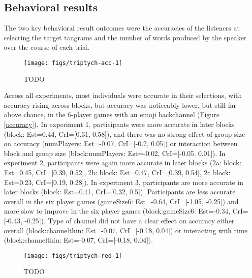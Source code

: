 \documentclass[
  english,
  a4paper,
]{article}
\begin{document}
\hypertarget{behavioral-results}{%
\subsection{Behavioral results}\label{behavioral-results}}

The two key behavioral result outcomes were the accuracies of the listeners at selecting the target tangrams and the number of words produced by the speaker over the course of each trial.

\begin{figure*}[t!]

{\centering \texttt{[image: figs/triptych-acc-1]} 

}

\caption{TODO}\label{fig:triptych-acc}
\end{figure*}

Across all experiments, most individuals were accurate in their selections, with accuracy rising across blocks, but accuracy was noticeably lower, but still far above chance, in the 6-player games with an emoji backchannel (Figure \ref{accuracy}). In experiment 1, participants were more accurate in later blocks (block: Est=0.44, CrI={[}0.31, 0.58{]}), and there was no strong effect of group size on accuracy (numPlayers: Est=-0.07, CrI={[}-0.2, 0.05{]}) or interaction between block and group size (block:numPlayers: Est=-0.02, CrI={[}-0.05, 0.01{]}). In experiment 2, participants were again more accurate in later blocks (2a: block: Est=0.45, CrI={[}0.39, 0.52{]}, 2b: block: Est=0.47, CrI={[}0.39, 0.54{]}, 2c block: Est=0.23, CrI={[}0.19, 0.28{]}). In experiment 3, participants are more accurate in later blocks (block: Est=0.41, CrI={[}0.32, 0.5{]}). Participants are less accurate overall in the six player games (gameSize6: Est=-0.64, CrI={[}-1.05, -0.25{]}) and more slow to improve in the six player games (block:gameSize6: Est=-0.34, CrI={[}-0.43, -0.25{]}). Type of channel did not have a clear effect on accuracy either overall (block:channelthin: Est=-0.07, CrI={[}-0.18, 0.04{]}) or interacting with time (block:channelthin: Est=-0.07, CrI={[}-0.18, 0.04{]}).

\begin{figure*}[t!]

{\centering \texttt{[image: figs/triptych-red-1]} 

}

\caption{TODO}\label{fig:triptych-red}
\end{figure*}
\end{document}
